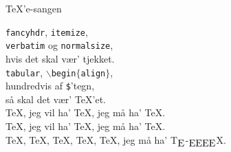 \begin{song}{\TeX'e-sangen}
  \begin{SBChorus}
\texttt{fancyhdr}, \texttt{itemize},\\
\texttt{verbatim} og \texttt{normalsize},\\
hvis det skal vær' tjekket.\\
\texttt{tabular}, \texttt{$\backslash$begin$\{$align$\}$},\\
hundredvis af \texttt{\$}'tegn,\\
så skal det vær' \TeX'et.\\
\TeX, jeg vil ha' \TeX, jeg må ha' \TeX.\\
\TeX, jeg vil ha' \TeX, jeg må ha' \TeX.\\
\TeX, \TeX, \TeX, \TeX, \TeX, jeg må ha' T\!$_{\text{\normalsize E}}$-$_{\text{\normalsize EEEE}}$\!X.
  \end{SBChorus}



  \begin{SBSection*}
  \end{SBSection*}
\end{song}